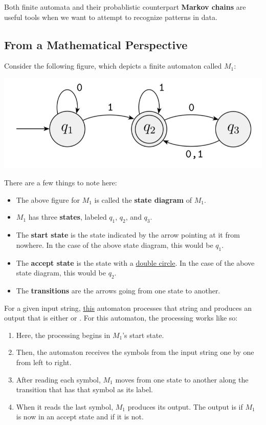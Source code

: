 \documentclass[letterpaper]{article}
\begin{document}
Both finite automata and their probablistic counterpart \textbf{Markov chains} are useful tools when we want to attempt to recognize patterns in data. 

\subsection{From a Mathematical Perspective}
Consider the following figure, which depicts a finite automaton called $M_1$:
\begin{center}
    \includegraphics[scale=0.4]{../assets/finite_automaton_1.png}
\end{center}
There are a few things to note here: 
\begin{itemize}
    \item The above figure for $M_1$ is called the \textbf{state diagram} of $M_1$. 
    \item $M_1$ has three \textbf{states}, labeled $q_1$, $q_2$, and $q_3$. 
    \item The \textbf{start state} is the state indicated by the arrow pointing at it from nowhere. In the case of the above state diagram, this would be $q_1$. 
    \item The \textbf{accept state} is the state with a \underline{double circle}. In the case of the above state diagram, this would be $q_2$. 
    \item The \textbf{transitions} are the arrows going from one state to another. 
\end{itemize}
For a given input string, \underline{this} automaton processes that string and produces an output that is either  or . For this automaton, the processing works like so: 
\begin{enumerate}
    \item Here, the processing begins in $M_1$'s start state. 
    \item Then, the automaton receives the symbols from the input string one by one from left to right. 
    \item After reading each symbol, $M_1$ moves from one state to another along the transition that has that symbol as its label. 
    \item When it reads the last symbol, $M_1$ produces its output. The output is  if $M_1$ is now in an accept state and  if it is not. 
\end{enumerate}
\end{document}
